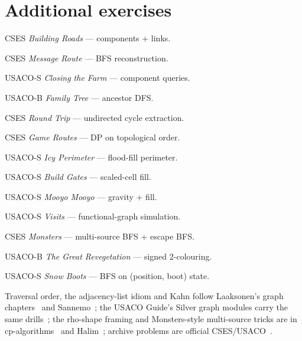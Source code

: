 \section{Additional exercises}
\begin{exercise}[easy] CSES \emph{Building Roads} --- components + links. \end{exercise}
\begin{exercise}[easy] CSES \emph{Message Route} --- BFS reconstruction. \end{exercise}
\begin{exercise}[easy] USACO-S \emph{Closing the Farm} --- component queries. \end{exercise}
\begin{exercise}[easy] USACO-B \emph{Family Tree} --- ancestor DFS. \end{exercise}
\begin{exercise}[medium] CSES \emph{Round Trip} --- undirected cycle extraction. \end{exercise}
\begin{exercise}[medium] CSES \emph{Game Routes} --- DP on topological order. \end{exercise}
\begin{exercise}[medium] USACO-S \emph{Icy Perimeter} --- flood-fill perimeter. \end{exercise}
\begin{exercise}[medium] USACO-S \emph{Build Gates} --- scaled-cell fill. \end{exercise}
\begin{exercise}[medium] USACO-S \emph{Mooyo Mooyo} --- gravity + fill. \end{exercise}
\begin{exercise}[medium] USACO-S \emph{Visits} --- functional-graph simulation. \end{exercise}
\begin{exercise}[hard] CSES \emph{Monsters} --- multi-source BFS + escape BFS. \end{exercise}
\begin{exercise}[hard] USACO-B \emph{The Great Revegetation} --- signed 2-colouring. \end{exercise}
\begin{exercise}[hard] USACO-S \emph{Snow Boots} --- BFS on (position, boot) state. \end{exercise}

\chapternotes
Traversal order, the adjacency-list idiom and Kahn follow
Laaksonen's graph chapters~\cite{laaksonen2024} and
Sannemo~\cite{sannemo2025}; the USACO Guide's Silver graph modules
carry the same drills~\cite{usacoguide}; the rho-shape framing and
Monsters-style multi-source tricks are in
cp-algorithms~\cite{cpalgorithms} and Halim~\cite{halimcp4}; archive
problems are official CSES/USACO~\cite{cses}.

